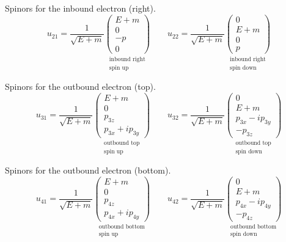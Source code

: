 Spinors for the inbound electron (right).
\begin{equation*}
u_{21}=\frac{1}{\sqrt{E+m}}
\underset{\substack{\text{inbound right}\\ \text{spin up}}}
{\begin{pmatrix}E+m\\0\\-p\\0\end{pmatrix}}
\qquad
u_{22}=\frac{1}{\sqrt{E+m}}
\underset{\substack{\text{inbound right}\\ \text{spin down}}}
{\begin{pmatrix}0\\E+m\\0\\p\end{pmatrix}}
\end{equation*}

Spinors for the outbound electron (top).
\begin{equation*}
u_{31}=\frac{1}{\sqrt{E+m}}
\underset{\substack{\text{outbound top}\\ \text{spin up}}}
{\begin{pmatrix}E+m\\0\\p_{3z}\\p_{3x}+ip_{3y}\end{pmatrix}}
\qquad
u_{32}=\frac{1}{\sqrt{E+m}}
\underset{\substack{\text{outbound top}\\ \text{spin down}}}
{\begin{pmatrix}0\\E+m\\p_{3x}-ip_{3y}\\-p_{3z}\end{pmatrix}}
\end{equation*}

Spinors for the outbound electron (bottom).
\begin{equation*}
u_{41}=\frac{1}{\sqrt{E+m}}
\underset{\substack{\text{outbound bottom}\\ \text{spin up}}}
{\begin{pmatrix}E+m\\0\\p_{4z}\\p_{4x}+ip_{4y}\end{pmatrix}}
\qquad
u_{42}=\frac{1}{\sqrt{E+m}}
\underset{\substack{\text{outbound bottom}\\ \text{spin down}}}
{\begin{pmatrix}0\\E+m\\p_{4x}-ip_{4y}\\-p_{4z}\end{pmatrix}}
\end{equation*}

